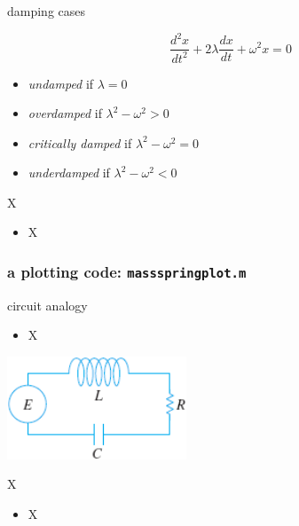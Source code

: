 \documentclass{beamer}
\begin{document}
\begin{frame}{damping cases}

$$\frac{d^2x}{dt^2} + 2 \lambda \frac{dx}{dt} + \omega^2 x=0$$

\begin{itemize}
\item \emph{undamped} if $\lambda = 0$
\item \emph{overdamped} if $\lambda^2-\omega^2 > 0$
\item \emph{critically damped} if $\lambda^2-\omega^2 = 0$
\item \emph{underdamped} if $\lambda^2-\omega^2 < 0$
\end{itemize}
\end{frame}



\begin{frame}{X}

\begin{itemize}
\item X
\end{itemize}
\end{frame}


\begin{frame}[fragile]
\frametitle{a plotting code: \texttt{massspringplot.m}}

\end{frame}


\begin{frame}{circuit analogy}

\begin{itemize}
\item X
\end{itemize}

\includegraphics[width=0.4\textwidth]{figs/rlc-circuit}
\end{frame}


\begin{frame}{X}

\begin{itemize}
\item X
\end{itemize}
\end{frame}
\end{document}
